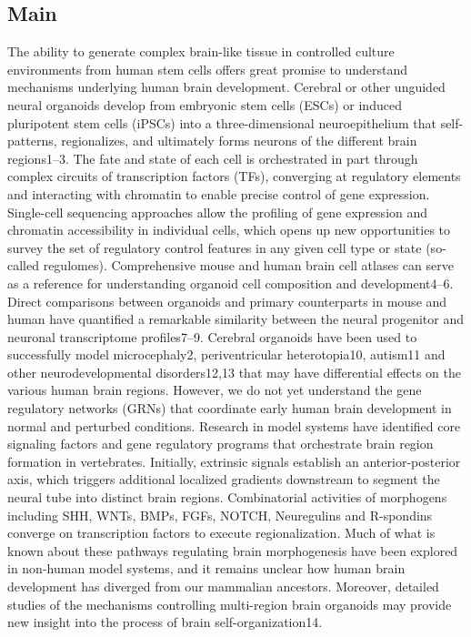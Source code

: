\subsection{Main}

The ability to generate complex brain-like tissue in controlled culture environments from human stem cells offers great promise to understand mechanisms underlying human brain development. Cerebral or other unguided neural organoids develop from embryonic stem cells (ESCs) or induced pluripotent stem cells (iPSCs) into a three-dimensional neuroepithelium that self-patterns, regionalizes, and ultimately forms neurons of the different brain regions1–3. The fate and state of each cell is orchestrated in part through complex circuits of transcription factors (TFs), converging at regulatory elements and interacting with chromatin to enable precise control of gene expression. Single-cell sequencing approaches allow the profiling of gene expression and chromatin accessibility in individual cells, which opens up new opportunities to survey the set of regulatory control features in any given cell type or state (so-called regulomes). Comprehensive mouse and human brain cell atlases can serve as a reference for understanding organoid cell composition and development4–6. Direct comparisons between organoids and primary counterparts in mouse and human have quantified a remarkable similarity between the neural progenitor and neuronal transcriptome profiles7–9. Cerebral organoids have been used to successfully model microcephaly2, periventricular heterotopia10, autism11 and other neurodevelopmental disorders12,13 that may have differential effects on the various human brain regions. However, we do not yet understand the gene regulatory networks (GRNs) that coordinate early human brain development in normal and perturbed conditions.
Research in model systems have identified core signaling factors and gene regulatory programs that orchestrate brain region formation in vertebrates. Initially, extrinsic signals establish an anterior-posterior axis, which triggers additional localized gradients downstream to segment the neural tube into distinct brain regions. Combinatorial activities of morphogens including SHH, WNTs, BMPs, FGFs, NOTCH, Neuregulins and R-spondins converge on transcription factors to execute regionalization. Much of what is known about these pathways regulating brain morphogenesis have been explored in non-human model systems, and it remains unclear how human brain development has diverged from our mammalian ancestors. Moreover, detailed studies of the mechanisms controlling multi-region brain organoids may provide new insight into the process of brain self-organization14.
